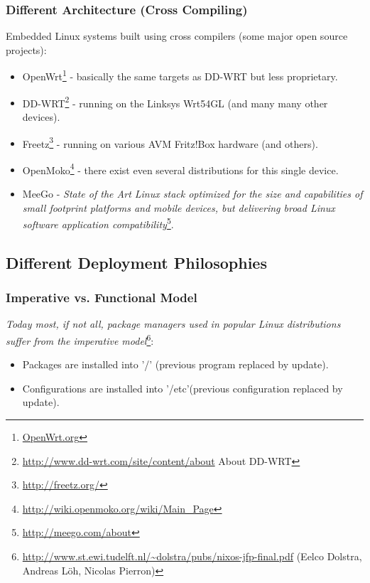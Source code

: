 \documentclass[a4paper,10pt]{article}
\begin{document}
\subsubsection{Different Architecture (Cross Compiling)}
Embedded Linux systems built using cross compilers (some major open source projects):
\begin{itemize}
\item OpenWrt\footnote{\url{OpenWrt.org}} - basically the same targets as DD-WRT but less proprietary.
\item DD-WRT\footnote{\url{http://www.dd-wrt.com/site/content/about} About DD-WRT} - running on the Linksys Wrt54GL (and many many other devices).
\item Freetz\footnote{\url{http://freetz.org/}} - running on various AVM Fritz!Box hardware (and others).
\item OpenMoko\footnote{\url{http://wiki.openmoko.org/wiki/Main_Page}} - there exist even several distributions for this single device.
\item MeeGo - \textit{State of the Art Linux stack optimized for the size and capabilities of small footprint platforms and mobile devices, but delivering broad Linux software application compatibility}\footnote{\url{http://meego.com/about}}.
\end{itemize}









\newpage
\subsection{Different Deployment Philosophies}
\subsubsection*{Imperative vs. Functional Model}
\textit{Today most, if not all, package managers used in popular Linux distributions suffer from the imperative model}\footnote{\url{http://www.st.ewi.tudelft.nl/~dolstra/pubs/nixos-jfp-final.pdf} (Eelco Dolstra, Andreas L\"oh, Nicolas Pierron)}:
\begin{itemize}
\item Packages are installed into '/' \hfill (previous program replaced by update). 
\item Configurations are installed into '/etc'\hfill (previous configuration replaced by update). 
\end{itemize}
\end{document}
